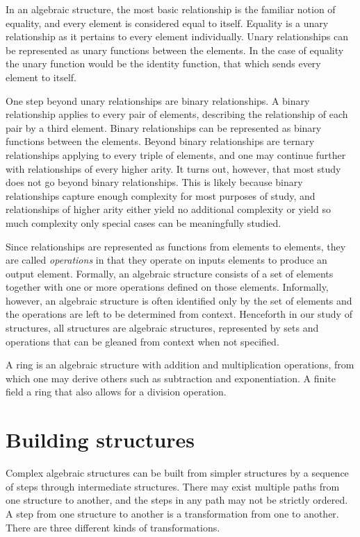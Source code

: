 In an algebraic structure, the most basic relationship is the familiar notion of equality, and every element is considered equal to itself.
Equality is a unary relationship as it pertains to every element individually.
Unary relationships can be represented as unary functions between the elements.
In the case of equality the unary function would be the identity function, that which sends every element to itself.

One step beyond unary relationships are binary relationships.
A binary relationship applies to every pair of elements, describing the relationship of each pair by a third element.
Binary relationships can be represented as binary functions between the elements.
Beyond binary relationships are ternary relationships applying to every triple of elements, and one may continue further with relationships of every higher arity.
It turns out, however, that most study does not go beyond binary relationships.
This is likely because binary relationships capture enough complexity for most purposes of study, and relationships of higher arity either yield no additional complexity or yield so much complexity only special cases can be meaningfully studied.

Since relationships are represented as functions from elements to elements, they are called \emph{operations} in that they operate on inputs elements to produce an output element.
Formally, an algebraic structure consists of a set of elements together with one or more operations defined on those elements.
Informally, however, an algebraic structure is often identified only by the set of elements and the operations are left to be determined from context.
Henceforth in our study of structures, all structures are algebraic structures, represented by sets and operations that can be gleaned from context when not specified.

A ring is an algebraic structure with addition and multiplication operations, from which one may derive others such as subtraction and exponentiation.
A finite field a ring that also allows for a division operation.


\section{Building structures}

Complex algebraic structures can be built from simpler structures by a sequence of steps through intermediate structures.
There may exist multiple paths from one structure to another, and the steps in any path may not be strictly ordered.
A step from one structure to another is a transformation from one to another.
There are three different kinds of transformations.

